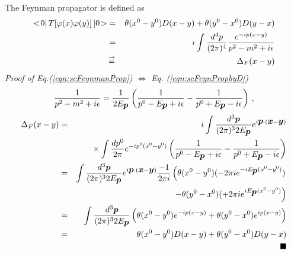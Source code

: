The Feynman propagator is defined as
\begin{eqnarray}
<\! 0 |\, T[\varphi(x) \varphi(y)] \,| 0 \!>
&=&
\theta(x^0 - y^0) D(x-y)
+
\theta(y^0 - x^0) D(y-x)
\label{eqn:scFeynPropbyD}
\\
&=&
i \int \frac{d^4 p}{(2\pi)^4}
\frac{e^{-ip (x-y)}}{p^2 - m^2 + i\epsilon}
\label{eqn:scFeynmanProp}
\\
&\,\mbox{$\stackrel{\rightarrow}{=}$}\,&
\Delta_F(x-y)
\nonumber
\end{eqnarray}
{\it Proof of Eq.(\ref{eqn:scFeynmanProp}) $\Leftrightarrow$ Eq. (\ref{eqn:scFeynPropbyD})}\\
\begin{eqnarray}
\frac{1}{p^2 - m^2 + i\epsilon}
=
\frac{1}{2 E_{\mbox{\boldmath $p$}}} \left(
\frac{1}{p^0 - E_{\mbox{\boldmath $p$}} + i\epsilon}
-
\frac{1}{p^0 + E_{\mbox{\boldmath $p$}} - i\epsilon}
\right)
\,,
\end{eqnarray}
\begin{eqnarray}
\Delta_F(x-y)
&=&
i \int \frac{d^3 \bld{p}}{(2\pi)^3 2 E_{\bld{p}}} e^{i\bld{p}\cdot (\bld{x} - \bld{y})}
\nonumber\\
&&
\times \int \frac{d p^0}{2\pi} e^{- ip^0 (x^0 - y^0)}
\left(
\frac{1}{p^0 - E_{\bld{p}} + i\epsilon}
-
\frac{1}{p^0 + E_{\bld{p}} - i\epsilon}
\right)
\nonumber\\
&=&
\int \frac{d^3 \bld{p}}{(2\pi)^3 2 E_{\bld{p}}} e^{i\bld{p}\cdot (\bld{x} - \bld{y})}
\frac{-1}{2\pi i} \left(
\theta(x^0 - y^0) (-2\pi i e^{-i E_{\bld{p}}(x^0 - y^0)})
\right.
\nonumber\\
&&
\left.
-
\theta(y^0 - x^0) (+2\pi i e^{i E_{\bld{p}}(x^0 - y^0)}
\right)
\nonumber\\
&=&
\int \frac{d^3 \bld{p}}{(2\pi)^3 2 E_{\bld{p}}} 
\left(
\theta(x^0 - y^0) e^{-ip(x-y)}
+
\theta(y^0 - x^0) e^{i p(x-y)}
\right)
\nonumber\\
&=&
\theta(x^0 - y^0) D(x-y)
+
\theta(y^0 - x^0) D(y-x)
\nonumber\\
&& 
\hspace{65mm}
\blacksquare
\end{eqnarray}


